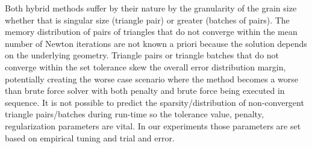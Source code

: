  \begin{algorithmic}[1]
	
	
	
					

			\EndFor
			
				
	

				\EndFor
	
			\EndIf
	
		\EndFor
	
	
	\EndFunction
	
 \label{algorithm:hybridBatches}
 \end{algorithmic}

Both hybrid methods suffer by their nature by the granularity of the grain size whether that is singular size (triangle pair) or greater (batches of pairs).
The memory distribution of pairs of triangles that do not converge within the mean number of Newton iterations are not known a priori because the solution depends on the underlying geometry. Triangle pairs or triangle batches that do not converge within the set tolerance skew the overall error distribution margin, potentially creating the worse case scenario where the method becomes a worse than brute force solver with both penalty and brute force being executed in sequence. It is not possible to predict the sparsity/distribution of non-convergent triangle pairs/batches during run-time so the tolerance value, penalty, regularization parameters are vital. In our experiments those parameters are set based on empirical tuning and trial and error.

